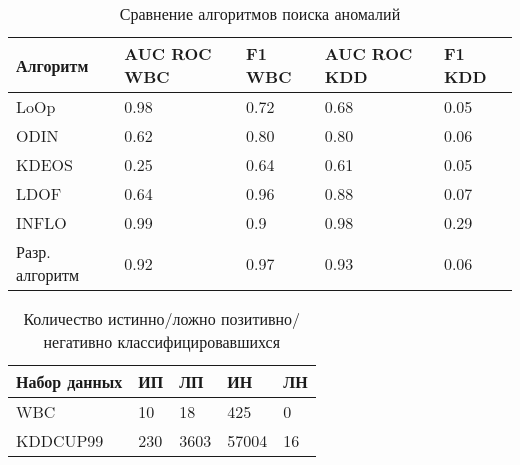 \begin{table}[h]
	
	\caption{\label{tab:issled2}Сравнение  алгоритмов поиска аномалий}
	
	\begin{center}
		
		\begin{tabular}{|l|l|l|l|l|}
			
			\hline
			
			Алгоритм & AUC ROC WBC & F1 WBC &  AUC ROC KDD & F1 KDD \\
			
			\hline 
			
			LoOp& 0.98 & 0.72 & 0.68& 0.05  \\
			
			\hline
			ODIN & 0.62 & 0.80 & 0.80& 0.06  \\
			
			\hline 
			KDEOS & 0.25	 & 0.64 & 0.61& 0.05  \\
			
			\hline 
			LDOF & 0.64	 & 0.96 & 0.88&0.07  \\
			\hline 
			INFLO & 0.99	 & 0.9 & 0.98&0.29  \\
			\hline   
			Разр. алгоритм & 0.92	 & 0.97 & 0.93 & 0.06  \\
			
			\hline  
			
		\end{tabular}
		
	\end{center}
	
\end{table}
\begin{table}[h]
	
	\caption{\label{tab:issled2}Количество истинно/ложно позитивно/негативно классифицировавшихся}
	
	\begin{center}
		
		\begin{tabular}{|l|l|l|l|l|}
			
			\hline
			
			Набор данных & ИП & ЛП &  ИН & ЛН \\
			
			\hline 
			
			WBC & 10 & 18 & 425 & 0  \\
			\hline 
			
			KDDCUP99& 230 & 3603 & 57004& 16  \\	 
			
			\hline  
			
		\end{tabular}
		
	\end{center}
	
\end{table}

